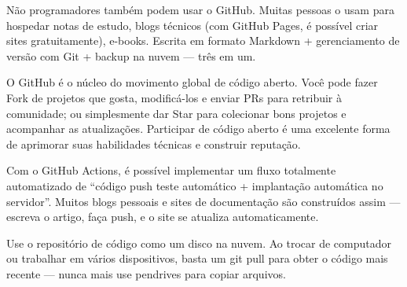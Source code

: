 
Não programadores também podem usar o GitHub. Muitas pessoas o usam para hospedar notas de estudo, blogs técnicos (com GitHub Pages, é possível criar sites gratuitamente), e-books. Escrita em formato Markdown + gerenciamento de versão com Git + backup na nuvem — três em um.


O GitHub é o núcleo do movimento global de código aberto. Você pode fazer Fork de projetos que gosta, modificá-los e enviar PRs para retribuir à comunidade; ou simplesmente dar Star para colecionar bons projetos e acompanhar as atualizações. Participar de código aberto é uma excelente forma de aprimorar suas habilidades técnicas e construir reputação.


Com o GitHub Actions, é possível implementar um fluxo totalmente automatizado de “código push teste automático + implantação automática no servidor”. Muitos blogs pessoais e sites de documentação são construídos assim — escreva o artigo, faça push, e o site se atualiza automaticamente.


Use o repositório de código como um disco na nuvem. Ao trocar de computador ou trabalhar em vários dispositivos, basta um git pull para obter o código mais recente — nunca mais use pendrives para copiar arquivos.



